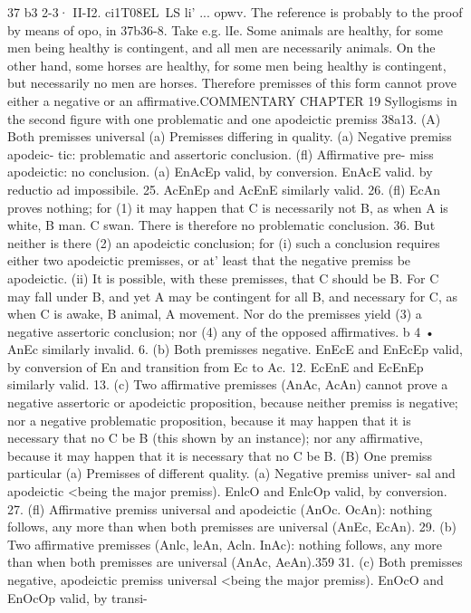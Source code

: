 {{{{{{{{{37 b3 2-3·
II-I2.
ci1T08EL~LS li' ... opwv. The reference is probably to the
proof by means of opo, in 37b36-8. Take e.g. lIe. Some animals
are healthy, for some men being healthy is contingent, and all
men are necessarily animals. On the other hand, some horses
are healthy, for some men being healthy is contingent, but
necessarily no men are horses. Therefore premisses of this form
cannot prove either a negative or an affirmative.COMMENTARY
CHAPTER 19
Syllogisms in the second figure with one problematic and one
apodeictic premiss
38a13.
(A) Both premisses universal
(a) Premisses differing in quality. (a) Negative premiss apodeic-
tic: problematic and assertoric conclusion. (fl) Affirmative pre-
miss apodeictic: no conclusion. (a) EnAcEp valid, by conversion.
EnAcE valid. by reductio ad impossibile.
25. AcEnEp and AcEnE similarly valid.
26. (fl) EcAn proves nothing; for (1) it may happen that C is
necessarily not B, as when A is white, B man. C swan. There is
therefore no problematic conclusion.
36. But neither is there (2) an apodeictic conclusion; for (i)
such a conclusion requires either two apodeictic premisses, or at'
least that the negative premiss be apodeictic. (ii) It is possible,
with these premisses, that C should be B. For C may fall under B,
and yet A may be contingent for all B, and necessary for C, as
when C is awake, B animal, A movement. Nor do the premisses
yield (3) a negative assertoric conclusion; nor (4) any of the
opposed affirmatives.
b 4 • AnEc similarly invalid.
6. (b) Both premisses negative. EnEcE and EnEcEp valid, by
conversion of En and transition from Ec to Ac.
12. EcEnE and EcEnEp similarly valid.
13. (c) Two affirmative premisses (AnAc, AcAn) cannot prove a
negative assertoric or apodeictic proposition, because neither
premiss is negative; nor a negative problematic proposition,
because it may happen that it is necessary that no C be B (this
shown by an instance); nor any affirmative, because it may
happen that it is necessary that no C be B.
(B) One premiss particular
(a) Premisses of different quality. (a) Negative premiss univer-
sal and apodeictic <being the major premiss). EnlcO and EnlcOp
valid, by conversion.
27. (fl) Affirmative premiss universal and apodeictic (AnOc.
OcAn): nothing follows, any more than when both premisses are
universal (AnEc, EcAn).
29. (b) Two affirmative premisses (Anlc, leAn, Acln. InAc):
nothing follows, any more than when both premisses are universal
(AnAc, AeAn).359
31. (c) Both premisses negative, apodeictic premiss universal
<being the major premiss). EnOcO and EnOcOp valid, by transi-
}}}}}}}}}
